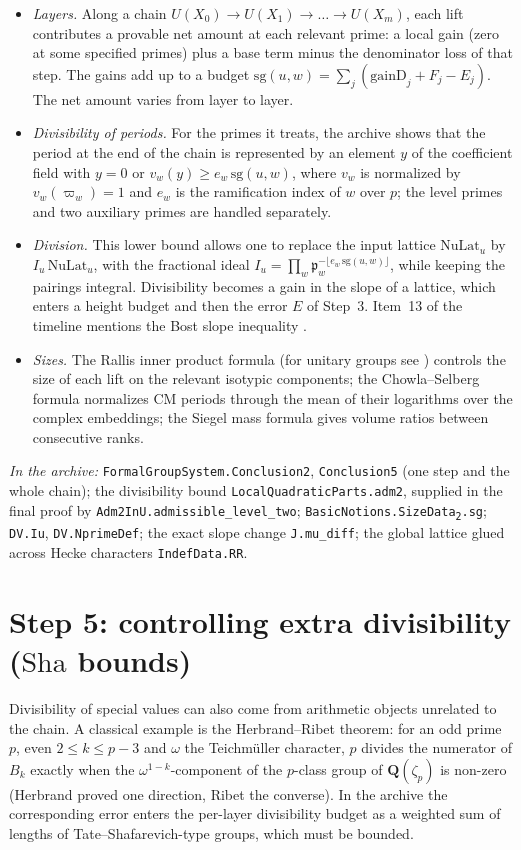 \documentclass[11pt]{article}
\newcommand{\Lean}[1]{\texttt{\small #1}}
\newcommand{\inarch}[1]{\par{\small\raggedright\noindent\emph{In the archive:} #1\par}}
\newcommand{\Q}{\mathbf{Q}}
\newcommand{\Sha}{\mathrm{Sha}}
\begin{document}
\begin{itemize}
\item \emph{Layers.} Along a chain $U(X_0)\to U(X_1)\to\dots\to U(X_m)$, each lift contributes a provable net amount at each relevant prime: a local gain (zero at some specified primes) plus a base term minus the denominator loss of that step. The gains add up to a budget $\mathrm{sg}(u,w)=\sum_j(\mathrm{gainD}_j+F_j-E_j)$. The net amount varies from layer to layer.
\item \emph{Divisibility of periods.} For the primes it treats, the archive shows that the period at the end of the chain is represented by an element $y$ of the coefficient field with $y=0$ or $v_w(y)\ge e_w\,\mathrm{sg}(u,w)$, where $v_w$ is normalized by $v_w(\varpi_w)=1$ and $e_w$ is the ramification index of $w$ over $p$; the level primes and two auxiliary primes are handled separately.
\item \emph{Division.} This lower bound allows one to replace the input lattice $\mathrm{NuLat}_u$ by $I_u\,\mathrm{NuLat}_u$, with the fractional ideal $I_u=\prod_w\mathfrak p_w^{-\lfloor e_w\,\mathrm{sg}(u,w)\rfloor}$, while keeping the pairings integral. Divisibility becomes a gain in the slope of a lattice, which enters a height budget and then the error $E$ of Step~3. Item~13 of the timeline mentions the Bost slope inequality \cite{bost}.
\item \emph{Sizes.} The Rallis inner product formula (for unitary groups see \cite{hks}) controls the size of each lift on the relevant isotypic components; the Chowla--Selberg formula \cite{cs} normalizes CM periods through the mean of their logarithms over the complex embeddings; the Siegel mass formula gives volume ratios between consecutive ranks.
\end{itemize}

\inarch{\Lean{FormalGroupSystem.Conclusion2}, \Lean{Conclusion5} (one step and the whole chain); the divisibility bound \Lean{LocalQuadraticParts.adm2}, supplied in the final proof by \Lean{Adm2InU.admissible\_level\_two}; \Lean{BasicNotions.SizeData\textsubscript{2}.sg}; \Lean{DV.Iu}, \Lean{DV.NprimeDef}; the exact slope change \Lean{J.mu\_diff}; the global lattice glued across Hecke characters \Lean{IndefData.RR}.}

\section{Step 5: controlling extra divisibility ($\Sha$ bounds)}\label{sec:s5}
Divisibility of special values can also come from arithmetic objects unrelated to the chain. A classical example is the Herbrand--Ribet theorem: for an odd prime $p$, even $2\le k\le p-3$ and $\omega$ the Teichm\"uller character, $p$ divides the numerator of $B_k$ exactly when the $\omega^{1-k}$-component of the $p$-class group of $\Q(\zeta_p)$ is non-zero (Herbrand \cite{herbrand} proved one direction, Ribet \cite{ribet} the converse). In the archive the corresponding error enters the per-layer divisibility budget as a weighted sum of lengths of Tate--Shafarevich-type groups, which must be bounded.
\end{document}
